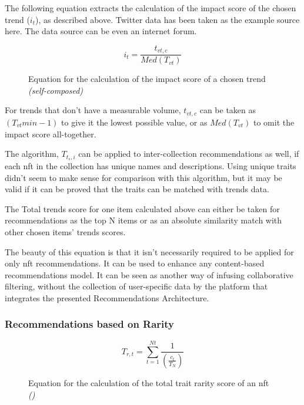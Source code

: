\noindent The following equation extracts the calculation of the impact score of the chosen trend ($i_{t}$), as described above. Twitter data has been taken as the example source here. The data source can be even an internet forum.
\begin{figure}[h!]
\begin{equation}
i_{t} = \frac{t_{vt,c}}{Med(T_{vt})}
\end{equation}
\caption*{Equation for the calculation of the impact score of a chosen trend \textit{(self-composed)}}
\end{figure}

For trends that don't have a measurable volume, $t_{vt,c}$ can be taken as $\left(T_{vt}{min} - 1\right)$ to give it the lowest possible value, or as $Med(T_{vt})$ to omit the impact score all-together.

\bigbreak
The algorithm, $T_{t_{s},i}$ can be applied to inter-collection recommendations as well, if each \gls{nft} in the collection has unique names and descriptions. Using unique traits didn't seem to make sense for comparison with this algorithm, but it may be valid if it can be proved that the traits can be matched with trends data.

The Total trends score for one item calculated above can either be taken for recommendations as the top N items or as an absolute similarity match with other chosen items' trends scores.

\bigbreak
The beauty of this equation is that it isn't necessarily required to be applied for only \gls{nft} recommendations. It can be used to enhance any content-based recommendations model. It can be seen as another way of infusing collaborative filtering, without the collection of user-specific data by the platform that integrates the presented Recommendations Architecture.


\subsubsection{Recommendations based on Rarity}
% 

\begin{figure}[h!]
\begin{equation}
T_{r,t} = \sum^{Nt}_{t=1} \frac{1}{\left(\frac{c_{t}}{T_{N}}\right)}
\end{equation}
\caption*{Equation for the calculation of the total trait rarity score of an \gls{nft} \textit{()}}
\end{figure}

